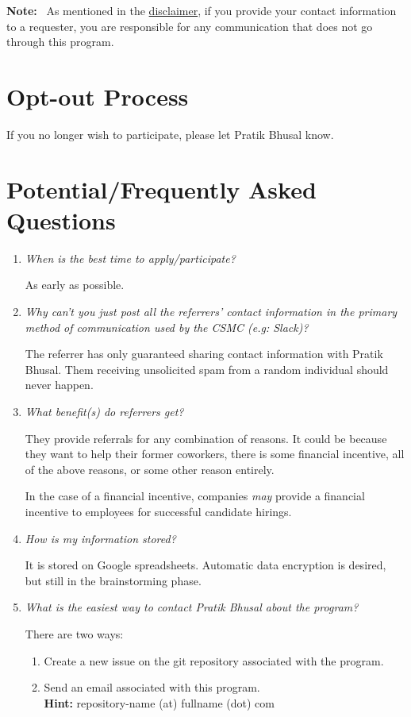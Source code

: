 \documentclass[letterpaper, 12pt]{article}
\newcommand{\QA}[2]{\textit{#1}\medskip

    #2\bigskip
}
\newcommand{\note}[1]{\textbf{Note:}~#1}
\begin{document}
\note{%
    As mentioned in the \hyperref[section:disclaimer:spamMessages]{disclaimer},
    if you provide your contact information to a requester, you are responsible
    for any communication that does not go through this program.
}

\section{Opt-out Process}

If you no longer wish to participate, please let Pratik Bhusal know.

\section{Potential/Frequently Asked Questions}

\begin{enumerate}[leftmargin=*]
    \item\QA%
        {When is the best time to apply/participate?}
        {As early as possible.}
    \item\QA%
        {%
            Why can't you just post all the referrers' contact information in
            the primary method of communication used by the CSMC (e.g: Slack)?
        }
        {%
            The referrer has only guaranteed sharing contact information with
            Pratik Bhusal. Them receiving unsolicited spam from a random
            individual should never happen.
        }
    \item\QA%
        {%
            What benefit(s) do referrers get?
        }
        {%
            They provide referrals for any combination of reasons. It could be
            because they want to help their former coworkers, there is some
            financial incentive, all of the above reasons, or some other reason
            entirely.

            In the case of a financial incentive, companies \textit{may} provide
            a financial incentive to employees for successful candidate hirings.
        }
    \item\QA%
        {How is my information stored?}
        {%
            It is stored on Google spreadsheets. Automatic data encryption is
            desired, but still in the brainstorming phase.
        }
    \item\QA%
        {What is the easiest way to contact Pratik Bhusal about the program?}
        {%
            There are two ways:

            \begin{enumerate}
                \item Create a new issue on the git repository associated with
                    the program.
                \item Send an email associated with this
                    program.\\\textbf{Hint:} repository-name (at) fullname (dot) com

            \end{enumerate}
        }
\end{enumerate}
\end{document}
